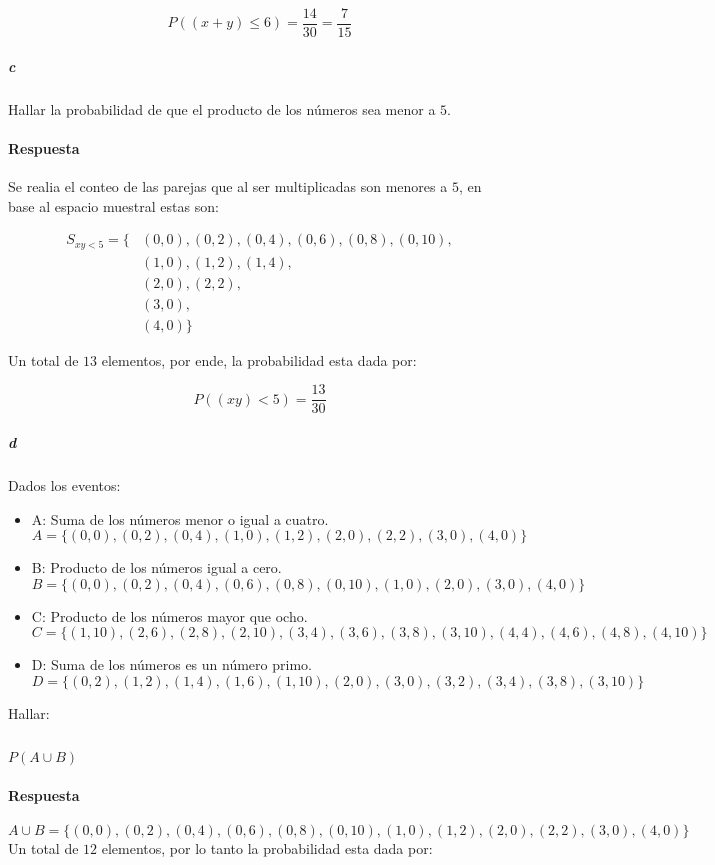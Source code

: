 \documentclass{article}
\begin{document}
$$P((x+y)\leq6) = \frac{14}{30} = \frac{7}{15}$$

\subparagraph{c} Hallar la probabilidad de que el producto de los números sea menor a $5$.
\paragraph{Respuesta} Se realia el conteo de las parejas que al ser multiplicadas son menores a $5$, en base al espacio muestral estas son:

\begin{align*}
	S_{xy < 5} = \{
		&(0,0), (0,2), (0,4), (0,6), (0,8), (0,10), \\
		&(1,0), (1,2), (1,4),\\
		&(2,0), (2,2),\\
		&(3,0),\\
		&(4,0)
	\}
\end{align*}

Un total de $13$ elementos, por ende, la probabilidad esta dada por:

$$P((xy)<5) = \frac{13}{30}$$

\subparagraph{d} Dados los eventos:
\begin{itemize}
	\item{A}: Suma de los números menor o igual a cuatro.\\
		$$A = \{(0,0), (0,2), (0,4), (1,0), (1,2), (2,0), (2,2), (3,0), (4,0)\}$$
	\item{B}: Producto de los números igual a cero.\\
		$$B = \{(0,0), (0,2), (0,4), (0,6), (0,8), (0,10), (1,0), (2,0), (3,0), (4,0)\}$$
	\item{C}: Producto de los números mayor que ocho.\\
		$$C = \{(1,10),(2,6), (2,8), (2,10), (3,4), (3,6), (3,8), (3,10), (4,4), (4,6), (4,8), (4,10)\}$$
	\item{D}: Suma de los números es un número primo.\\
		$$D = \{(0,2), (1,2), (1,4), (1,6), (1,10), (2,0), (3,0), (3,2), (3,4), (3,8), (3,10)\}$$
\end{itemize}

Hallar:

\subparagraph{}$P(A \cup B)$

\paragraph{Respuesta}
$$A \cup B = \{(0,0), (0,2), (0,4), (0,6), (0,8), (0,10), (1,0), (1,2), (2,0), (2,2), (3,0), (4,0) \}$$
Un total de $12$ elementos, por lo tanto la probabilidad esta dada por:
\end{document}

